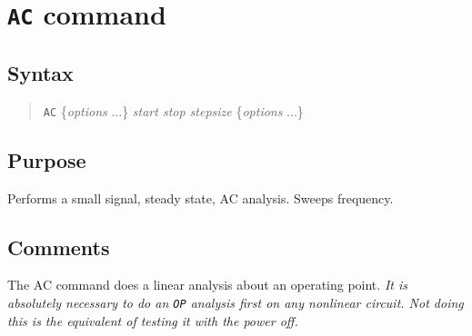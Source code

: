 %
%
%
%
\section{{\tt AC} command}
\subsection{Syntax}
\begin{verse}
{\tt AC} \{{\it options} ...\} {\it start stop stepsize} \{{\it options} ...\}
\end{verse}
\subsection{Purpose}

Performs a small signal, steady state, AC analysis.  Sweeps frequency.
\subsection{Comments}

The AC command does a linear analysis about an operating point.  {\em It is absolutely
necessary to do an {\tt OP} analysis first on any nonlinear circuit.  Not
doing this is the equivalent of testing it with the power off.}

